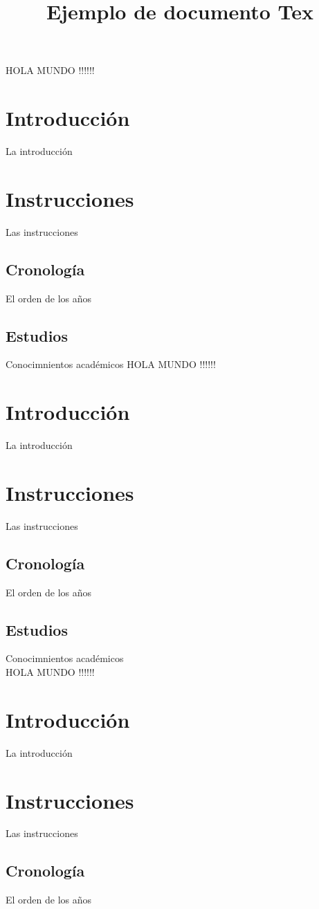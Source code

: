 \documentclass[30pt,a4paper]{article}
\title{Ejemplo de documento Tex}
\begin{document}
  \maketitle
  HOLA MUNDO !!!!!! 
  \section{Introducción}
    La introducción
  \section{Instrucciones}
    Las instrucciones
    \subsection{Cronología}
      El orden de los años
    \subsection{Estudios}
      Conocimnientos académicos
  HOLA MUNDO !!!!!! 
  \section{Introducción}
    La introducción
  \section{Instrucciones}
    Las instrucciones
    \subsection{Cronología}
      El orden de los años
    \subsection{Estudios}
      Conocimnientos académicos\\
              HOLA MUNDO !!!!!! 
  \section{Introducción}
    La introducción
  \section{Instrucciones}
    Las instrucciones
    \subsection{Cronología}
      El orden de los años
\end{document}
